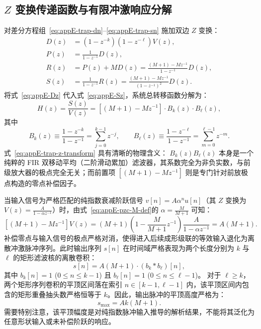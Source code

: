 \subsection{$Z$ 变换传递函数与有限冲激响应分解}

对差分方程组~\eqref{eq:appE-trap-dn}--\eqref{eq:appE-trap-sn} 施加双边 $Z$ 变换：
\begin{align}
D(z) &= (1 - z^{-k})(1 - z^{-\ell}) V(z), \label{eq:appE-Dz} \\
P(z) &= \frac{1}{1 - z^{-1}} D(z), \label{eq:appE-Pz} \\
R(z) &= P(z) + M D(z) = \frac{(M+1) - M z^{-1}}{1 - z^{-1}} D(z), \label{eq:appE-Rz} \\
S(z) &= \frac{1}{1 - z^{-1}} R(z) = \frac{(M+1) - M z^{-1}}{(1 - z^{-1})^2} D(z). \label{eq:appE-Sz}
\end{align}
将式~\eqref{eq:appE-Dz} 代入式~\eqref{eq:appE-Sz}，系统总转移函数分解为：
\begin{equation}\label{eq:appE-trap-z-transform}
H(z) = \frac{S(z)}{V(z)} = \left[ (M+1) - M z^{-1} \right] \cdot B_k(z) \cdot B_\ell(z),
\end{equation}
其中
\begin{equation}\label{eq:appE-bk-bell-def}
B_k(z) \equiv \frac{1 - z^{-k}}{1 - z^{-1}} = \sum_{j=0}^{k-1} z^{-j}, \qquad
B_\ell(z) \equiv \frac{1 - z^{-\ell}}{1 - z^{-1}} = \sum_{m=0}^{\ell-1} z^{-m}.
\end{equation}
式~\eqref{eq:appE-trap-z-transform} 具有清晰的物理含义：
$B_k(z) B_\ell(z)$ 本身是一个纯粹的 FIR 双移动平均（二阶滑动累加）滤波器，其系数完全为非负实数，与前级放大器的极点完全无关；而前置项 $[(M+1) - M z^{-1}]$ 则是专门针对前放极点构造的零点补偿因子。

当输入信号为严格匹配的纯指数衰减阶跃信号 $v[n] = A \alpha^n u[n]$（其 $Z$ 变换为 $V(z) = \frac{A}{1 - \alpha z^{-1}}$）时，由式~\eqref{eq:appE-pzc-M-def}的 $\alpha = \frac{M}{M+1}$ 可知：
\begin{equation}\label{eq:appE-pole-cancellation-exact}
[(M+1) - M z^{-1}] V(z) = (M+1) \left( 1 - \frac{M}{M+1} z^{-1} \right) \frac{A}{1 - \alpha z^{-1}} = A (M+1).
\end{equation}
补偿零点与输入信号的极点严格对消，使得进入后续成形级联的等效输入退化为离散冲激脉冲序列。此时输出序列 $s[n]$ 在时间域严格表现为两个长度分别为 $k$ 与 $\ell$ 的矩形滤波核的离散卷积：
\begin{equation}\label{eq:appE-sn-convolution}
s[n] = A (M+1) \cdot \left( b_k * b_\ell \right)[n],
\end{equation}
其中 $b_k[n] = 1$ ($0 \le n \le k-1$) 且 $b_\ell[n] = 1$ ($0 \le n \le \ell-1$)。
对于 $\ell \ge k$，两个矩形序列卷积的平顶区间落在索引 $n \in [k-1, \ell-1]$ 内，该平顶区间内包含的矩形重叠抽头数严格恒等于 $k$。因此，输出脉冲的平顶高度严格为：
\begin{equation}\label{eq:appE-peak-amplitude}
s_{\max} = A k (M + 1).
\end{equation}
需要特别注意，该平顶幅度是对纯指数脉冲输入推导的解析结果，不能将其泛化为任意形状输入或未补偿阶跃的响应。

